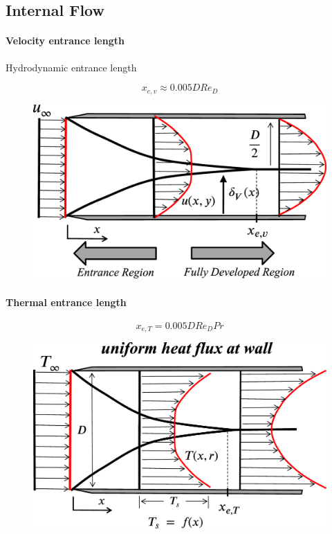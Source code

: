 \documentclass[12pt, a4paper]{article}
\begin{document}
\subsection{Internal Flow}
\paragraph{Velocity entrance length} Hydrodynamic entrance length

\[
    x_{e,v} \approx 0.005 D Re_{D}
\]
\begin{figure}[H]
    \centering
    \includegraphics[width=.6\textwidth]{img/velocity_entrance_length.eps}
\end{figure}

\paragraph{Thermal entrance length}
\[
    x_{e,T} = 0.005 D Re_{D} Pr
\]
\begin{figure}[H]
    \centering
    \includegraphics[width=.6\textwidth]{img/thermal_entrance_length.eps}
\end{figure}
\end{document}
